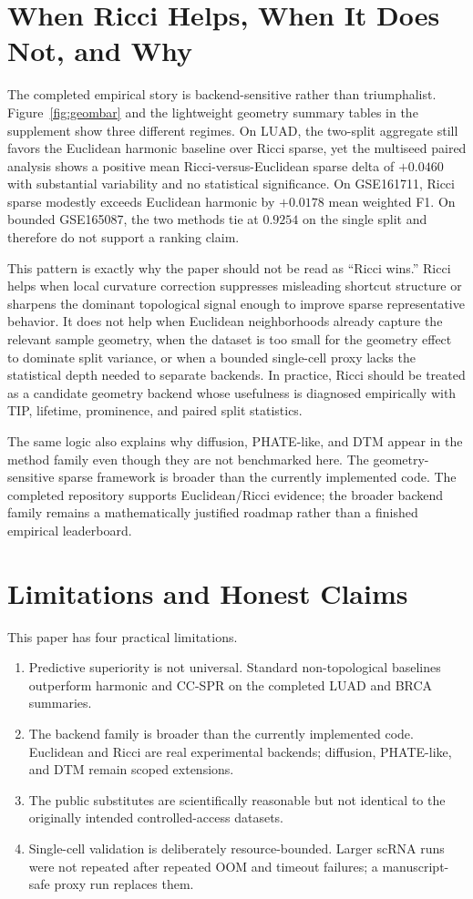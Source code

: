 \documentclass[11pt]{article}
\begin{document}
\section{When Ricci Helps, When It Does Not, and Why}
The completed empirical story is backend-sensitive rather than triumphalist. Figure~\ref{fig:geombar} and the lightweight geometry summary tables in the supplement show three different regimes. On LUAD, the two-split aggregate still favors the Euclidean harmonic baseline over Ricci sparse, yet the multiseed paired analysis shows a positive mean Ricci-versus-Euclidean sparse delta of $+0.0460$ with substantial variability and no statistical significance. On GSE161711, Ricci sparse modestly exceeds Euclidean harmonic by $+0.0178$ mean weighted F1. On bounded GSE165087, the two methods tie at $0.9254$ on the single split and therefore do not support a ranking claim.

This pattern is exactly why the paper should not be read as ``Ricci wins.'' Ricci helps when local curvature correction suppresses misleading shortcut structure or sharpens the dominant topological signal enough to improve sparse representative behavior. It does not help when Euclidean neighborhoods already capture the relevant sample geometry, when the dataset is too small for the geometry effect to dominate split variance, or when a bounded single-cell proxy lacks the statistical depth needed to separate backends. In practice, Ricci should be treated as a candidate geometry backend whose usefulness is diagnosed empirically with TIP, lifetime, prominence, and paired split statistics.

The same logic also explains why diffusion, PHATE-like, and DTM appear in the method family even though they are not benchmarked here. The geometry-sensitive sparse framework is broader than the currently implemented code. The completed repository supports Euclidean/Ricci evidence; the broader backend family remains a mathematically justified roadmap rather than a finished empirical leaderboard.

\section{Limitations and Honest Claims}
This paper has four practical limitations.
\begin{enumerate}[leftmargin=1.5em]
\item Predictive superiority is not universal. Standard non-topological baselines outperform harmonic and CC-SPR on the completed LUAD and BRCA summaries.
\item The backend family is broader than the currently implemented code. Euclidean and Ricci are real experimental backends; diffusion, PHATE-like, and DTM remain scoped extensions.
\item The public substitutes are scientifically reasonable but not identical to the originally intended controlled-access datasets.
\item Single-cell validation is deliberately resource-bounded. Larger scRNA runs were not repeated after repeated OOM and timeout failures; a manuscript-safe proxy run replaces them.
\end{enumerate}
\end{document}
